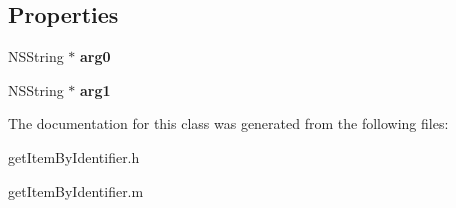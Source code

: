 \subsection*{Properties}
\begin{DoxyCompactItemize}
\item 
\hypertarget{interfaceget_item_by_identifier_a9377dcadce02e4752ab2b858fb479414}{}N\+S\+String $\ast$ {\bfseries arg0}\label{interfaceget_item_by_identifier_a9377dcadce02e4752ab2b858fb479414}

\item 
\hypertarget{interfaceget_item_by_identifier_a2530c50c9414aa14537317285ebc64f7}{}N\+S\+String $\ast$ {\bfseries arg1}\label{interfaceget_item_by_identifier_a2530c50c9414aa14537317285ebc64f7}

\end{DoxyCompactItemize}


The documentation for this class was generated from the following files\+:\begin{DoxyCompactItemize}
\item 
get\+Item\+By\+Identifier.\+h\item 
get\+Item\+By\+Identifier.\+m\end{DoxyCompactItemize}
